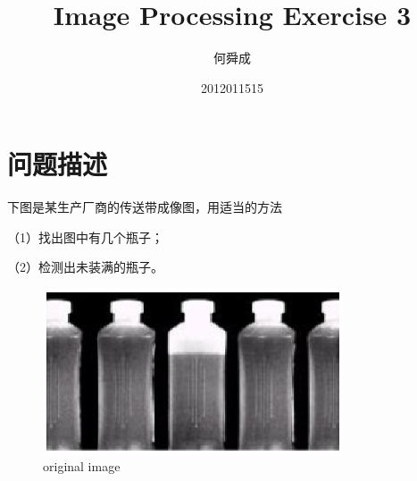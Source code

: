 \documentclass[UTF8]{ctexart}
\author{何舜成}
\date{2012011515}
\title{Image Processing Exercise 3}
\begin{document}
\maketitle
\section{问题描述}
下图是某生产厂商的传送带成像图，用适当的方法\par
（1）找出图中有几个瓶子；\par
（2）检测出未装满的瓶子。\par
\begin{figure}[htbp]
\centerline{\includegraphics[width=3.5in]{origin.eps}}
\caption[]{original image}
\end{figure}
\end{document}
